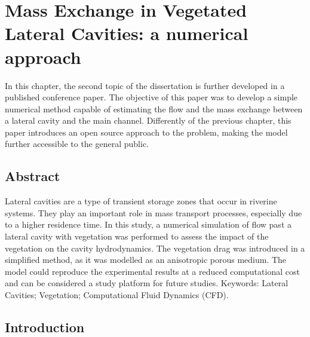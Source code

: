 \chapter{Mass Exchange in Vegetated Lateral Cavities: a numerical approach}
\label{chap:art4}
In this chapter, the second topic of the dissertation is further developed in a published conference paper. The objective of this paper was to develop a simple numerical method capable of estimating the flow and the mass exchange between a lateral cavity and the main channel. Differently of the previous chapter, this paper introduces an open source approach to the problem, making the model further accessible to the general public.

\section*{Abstract}
Lateral cavities are a type of transient storage zones that occur in riverine systems. They play an important role in mass transport processes, especially due to a higher residence time. In this study, a numerical simulation of flow past a lateral cavity with vegetation was performed to assess the impact of the vegetation on the cavity hydrodynamics. The vegetation drag was introduced in a simplified method, as it was modelled as an anisotropic porous medium. The model could reproduce the experimental results at a reduced computational cost and can be considered a study platform for future studies.
Keywords: Lateral Cavities; Vegetation; Computational Fluid Dynamics (CFD).

\section{Introduction}

\printbibliography[segment=\therefsegment,heading=subbibliography, title={References}]